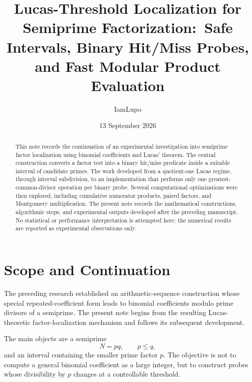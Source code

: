 \documentclass[11pt,a4paper]{article}
\title{\textbf{Lucas-Threshold Localization for Semiprime Factorization:}\
Safe Intervals, Binary Hit/Miss Probes, and Fast Modular Product Evaluation}
\author{IamLupo}
\date{13 September 2026}
\begin{document}
\maketitle

\begin{abstract}
This note records the continuation of an experimental investigation into semiprime factor localization using binomial coefficients and Lucas' theorem. The central construction converts a factor test into a binary hit/miss predicate inside a suitable interval of candidate primes. The work developed from a quotient-one Lucas regime, through interval subdivision, to an implementation that performs only one greatest-common-divisor operation per binary probe. Several computational optimizations were then explored, including cumulative numerator products, paired factors, and Montgomery multiplication. The present note records the mathematical constructions, algorithmic steps, and experimental outputs developed after the preceding manuscript. No statistical or performance interpretation is attempted here; the numerical results are reported as experimental observations only.
\end{abstract}

\tableofcontents
\newpage

\section{Scope and Continuation}

The preceding research established an arithmetic-sequence construction whose special repeated-coefficient form leads to binomial coefficients modulo prime divisors of a semiprime. The present note begins from the resulting Lucas-theoretic factor-localization mechanism and follows its subsequent development.

The main objects are a semiprime
\[
N=pq,
\qquad p\le q,
\]
and an interval containing the smaller prime factor $p$. The objective is not to compute a general binomial coefficient as a large integer, but to construct probes whose divisibility by $p$ changes at a controllable threshold.
\end{document}
